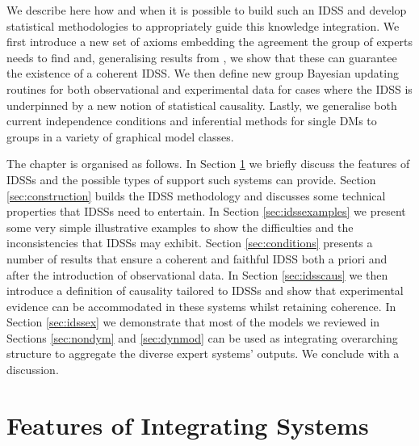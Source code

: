 We describe here how and when it is possible to build such an IDSS and develop statistical methodologies to appropriately guide this knowledge integration. We first introduce a new set of axioms embedding the agreement the group of experts needs to find and, generalising results from \citet{Goldstein96}, we show that these can guarantee the existence of a coherent IDSS. We then define new group Bayesian updating routines for both observational and experimental data for cases where the IDSS is underpinned by a new notion of statistical causality. Lastly, we generalise both current independence conditions and inferential methods for single DMs to groups in a variety of graphical model classes.

The chapter is organised as follows. In Section \ref{sec:features1} we briefly discuss the features of IDSSs and the possible types of support such systems can provide. Section \ref{sec:construction} builds the IDSS methodology and discusses some technical properties that IDSSs need to entertain. In Section \ref{sec:idssexamples} we present some very simple illustrative examples to show the difficulties and the inconsistencies that IDSSs may exhibit.  Section \ref{sec:conditions} presents a number of results that ensure a coherent and faithful IDSS both a priori and after the introduction of observational data. In Section \ref{sec:idsscaus} we then introduce a definition of causality tailored to IDSSs and show that  experimental evidence can be accommodated in these systems whilst retaining coherence. In Section \ref{sec:idssex} we demonstrate that most of the models we reviewed in Sections \ref{sec:nondym} and \ref{sec:dynmod} can be used as integrating overarching structure to aggregate the diverse expert systems' outputs. We conclude with a discussion. 
 
\section{Features of Integrating Systems}
\label{sec:features1}

